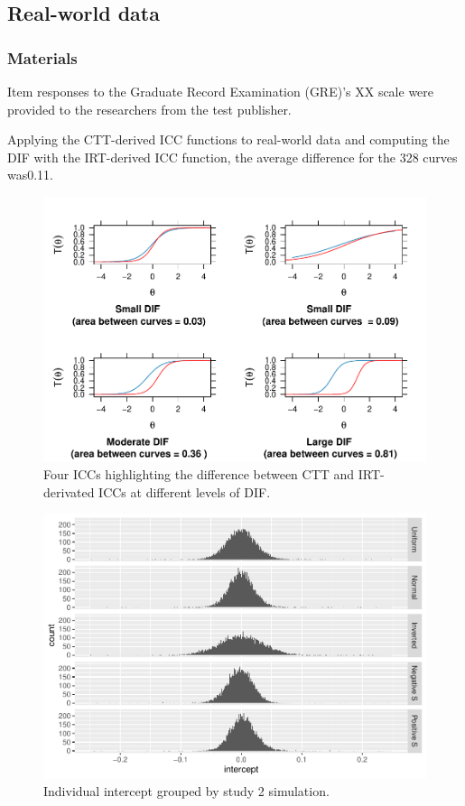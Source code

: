 \documentclass[
  jou]{apa6}
\begin{document}
\hypertarget{real-world-data}{%
\subsection{Real-world data}\label{real-world-data}}

\hypertarget{materials}{%
\subsubsection{Materials}\label{materials}}

Item responses to the Graduate Record Examination (GRE)'s XX scale were provided to the researchers from the test publisher.

Applying the CTT-derived ICC functions to real-world data and computing the DIF with the IRT-derived ICC function, the average difference for the 328 curves was0.11.

\begin{figure}
\centering
\includegraphics{ICC_project_files/figure-latex/plotting-1.pdf}
\caption{\label{fig:plotting}Four ICCs highlighting the difference between CTT and IRT-derivated ICCs at different levels of DIF.}
\end{figure}

\begin{figure}
\centering
\includegraphics{ICC_project_files/figure-latex/stackedplotIntercept-1.pdf}
\caption{\label{fig:stackedplotIntercept}Individual intercept grouped by study 2 simulation.}
\end{figure}
\end{document}

